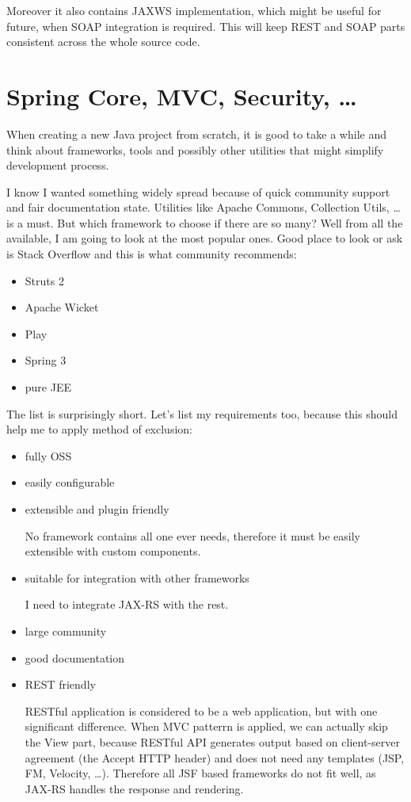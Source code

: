 	Moreover it also contains \gls{JAXWS} implementation, which might be useful for future, when SOAP integration is
	required. This will keep REST and SOAP parts consistent across the whole source code.
	
	\section{Spring Core, MVC, Security, \ldots}
	
	When creating a new Java project from scratch, it is good to take a while and think about frameworks, tools and
	possibly other utilities that might simplify development process.
	
	I know I wanted something widely spread because of quick community support and fair documentation state. Utilities like
	Apache Commons, Collection Utils, \ldots is a must. But which framework to choose if there are so many? Well from all
	the available, I am going to look at the most popular ones. Good place to look or ask is Stack Overflow and this is
	what community recommends:
	
	\begin{itemize}
		\item Struts 2
		\item Apache Wicket
		\item Play
		\item Spring 3
		\item pure JEE
	\end{itemize}
	
	The list is surprisingly short. Let's list my requirements too, because this should help me to apply method of
	exclusion:
	
	\begin{itemize}
		\item fully \gls{OSS}
		\item easily configurable
		\item extensible and plugin friendly
		
		No framework contains all one ever needs, therefore it must be easily extensible with custom components.
		\item suitable for integration with other frameworks
		
		I need to integrate JAX-RS with the rest.
		\item large community
		\item good documentation
		\item REST friendly
		
		RESTful application is considered to be a web application, but with one significant difference. When MVC patterrn is
		applied, we can actually skip the View part, because RESTful API generates output based on client-server agreement
		(the Accept HTTP header) and does not need any templates (JSP, FM, Velocity, \ldots). Therefore all JSF based frameworks
		do not fit well, as JAX-RS handles the response and rendering.
	\end{itemize}
	
